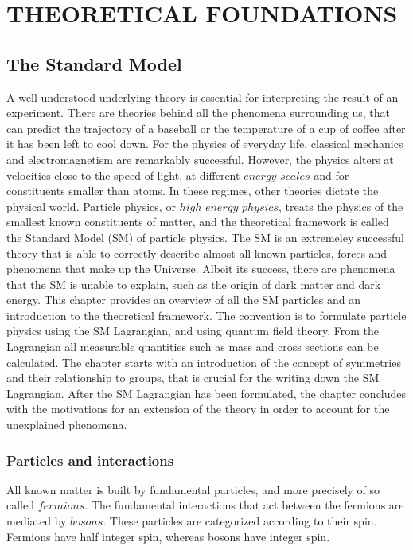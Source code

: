 \part{THEORETICAL FOUNDATIONS}
\noindent\justify
\chapter{The Standard Model} \label{sec:theory}
\noindent\justify
A well understood underlying theory is essential for interpreting the result of an experiment.
There are theories behind all the phenomena surrounding us, that can predict the trajectory of a baseball or the temperature of a cup of coffee after it has been left to cool down. 
For the physics of everyday life, classical mechanics and electromagnetism are remarkably successful. 
However, the physics alters at velocities close to the speed of light, at different $energy$ $scales$ and for constituents smaller than atoms.
In these regimes, other theories dictate the physical world. 
Particle physics, or $high$ $energy$ $physics$, treats the physics of the smallest known constituents of matter, and the theoretical framework is called the Standard Model (SM) of particle physics.   
The SM is an extremeley successful theory that is able to correctly describe almost all known particles, forces and phenomena that make up the Universe. 
Albeit its success, there are phenomena that the SM is unable to explain, such as the origin of dark matter and dark energy. 
\newpara
\noindent\justify
This chapter provides an overview of all the SM particles and an introduction to the theoretical framework. 
The convention is to formulate particle physics using the SM Lagrangian, and using quantum field theory. 
From the Lagrangian all measurable quantities such as mass and cross sections can be calculated. 
The chapter starts with an introduction of the concept of symmetries and their relationship to groups, that is crucial for the writing down the SM Lagrangian.
After the SM Lagrangian has been formulated, the chapter concludes with the motivations for an extension of the theory in order to account for the unexplained phenomena.
\newpage
\section{Particles and interactions}  
\noindent\justify
All known matter is built by fundamental particles, and more precisely of so called $fermions$. 
The fundamental interactions that act between the fermions are mediated by $bosons$. 
These particles are categorized according to their spin. Fermions have half integer spin, whereas bosons have integer spin. 
